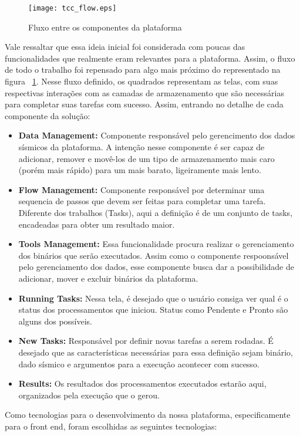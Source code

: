 \documentclass[11pt,twoside]{article}
\begin{document}
\begin{figure}[!h]
  \centering
  \texttt{[image: tcc\_flow.eps]}
  \caption{Fluxo entre os componentes da plataforma}
  \label{fig:flowScreen}
\end{figure}

Vale ressaltar que essa ideia inicial foi considerada com poucas das funcionalidades que realmente eram relevantes para a plataforma. Assim, o fluxo de todo o trabalho foi 
repensado para algo mais próximo do representado na figura ~\ref{fig:flowScreen}. Nesse fluxo definido, os quadrados representam as telas, com suas respectivas interações com 
as camadas de armazenamento que são necessárias para completar suas tarefas com sucesso. Assim, entrando no detalhe de cada componente da solução:

\begin{itemize}
  \item \textbf{Data Management:} Componente responsável pelo gerencimento dos dados sísmicos da plataforma. A intenção nesse componente é ser capaz de adicionar, remover e 
  movê-los de um tipo de armazenamento mais caro (porém mais rápido) para um mais barato, ligeiramente mais lento. 
  \item \textbf{Flow Management:} Componente responsável por determinar uma sequencia de passos que devem ser feitas para completar uma tarefa. Diferente dos trabalhos (Tasks),
  aqui a definição é de um conjunto de tasks, encadeadas para obter um resultado maior.
  \item \textbf{Tools Management:} Essa funcionalidade procura realizar o gerenciamento dos binários que serão executados. Assim como o componente respoonsável pelo gerenciamento
  dos dados, esse componente busca dar a possibilidade de adicionar, mover e excluir binários da plataforma.
  \item \textbf{Running Tasks:} Nessa tela, é desejado que o usuário consiga ver qual é o status dos processamentos que iniciou. Status como Pendente e Pronto são alguns dos 
  possíveis.
  \item \textbf{New Tasks:} Responsável por definir novas tarefas a serem rodadas. É desejado que as características necessárias para essa definição sejam binário, dado sísmico 
  e argumentos para a execução acontecer com sucesso. 
  \item \textbf{Results:} Os resultados dos processamentos executados estarão aqui, organizados pela execução que o gerou.
\end{itemize}

Como tecnologias para o desenvolvimento da nossa plataforma, especificamente para o front end, foram escolhidas as seguintes tecnologias:
\end{document}
